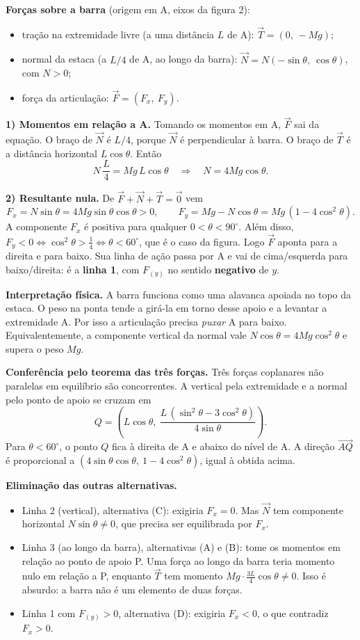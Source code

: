 \documentclass{article}%
\begin{document}
\textbf{Forças sobre a barra} (origem em A, eixos da figura 2):
\begin{itemize}
\item tração na extremidade livre (a uma distância $L$ de A): $\vec T = (0,\,-Mg)$;
\item normal da estaca (a $L/4$ de A, ao longo da barra): $\vec N = N(-\sin\theta,\ \cos\theta)$, com $N>0$;
\item força da articulação: $\vec F = (F_x,\ F_y)$.
\end{itemize}

\textbf{1) Momentos em relação a A.} Tomando os momentos em A, $\vec F$ sai da equação. O braço de $\vec N$ é $L/4$, porque $\vec N$ é perpendicular à barra. O braço de $\vec T$ é a distância horizontal $L\cos\theta$. Então
\[
N\,\frac{L}{4} = Mg\,L\cos\theta \quad\Longrightarrow\quad N = 4Mg\cos\theta .
\]

\textbf{2) Resultante nula.} De $\vec F + \vec N + \vec T = \vec 0$ vem
\[
F_x = N\sin\theta = 4Mg\sin\theta\cos\theta > 0, \qquad
F_y = Mg - N\cos\theta = Mg\,(1-4\cos^2\theta).
\]
A componente $F_x$ é positiva para qualquer $0<\theta<90^\circ$. Além disso, $F_y<0 \iff \cos^2\theta>\tfrac14 \iff \theta<60^\circ$, que é o caso da figura. Logo $\vec F$ aponta para a direita e para baixo. Sua linha de ação passa por A e vai de cima/esquerda para baixo/direita: é a \textbf{linha 1}, com $F_{(y)}$ no sentido \textbf{negativo} de $y$.

\textbf{Interpretação física.} A barra funciona como uma alavanca apoiada no topo da estaca. O peso na ponta tende a girá-la em torno desse apoio e a levantar a extremidade A. Por isso a articulação precisa \emph{puxar} A para baixo. Equivalentemente, a componente vertical da normal vale $N\cos\theta = 4Mg\cos^2\theta$ e supera o peso $Mg$.

\textbf{Conferência pelo teorema das três forças.} Três forças coplanares não paralelas em equilíbrio são concorrentes. A vertical pela extremidade e a normal pelo ponto de apoio se cruzam em
\[
Q=\left(L\cos\theta,\ \frac{L\,(\sin^2\theta-3\cos^2\theta)}{4\sin\theta}\right).
\]
Para $\theta<60^\circ$, o ponto $Q$ fica à direita de A e abaixo do nível de A. A direção $\overrightarrow{AQ}$ é proporcional a $(4\sin\theta\cos\theta,\ 1-4\cos^2\theta)$, igual à obtida acima.

\textbf{Eliminação das outras alternativas.}
\begin{itemize}
\item Linha 2 (vertical), alternativa (C): exigiria $F_x=0$. Mas $\vec N$ tem componente horizontal $N\sin\theta\neq 0$, que precisa ser equilibrada por $F_x$.
\item Linha 3 (ao longo da barra), alternativas (A) e (B): tome os momentos em relação ao ponto de apoio P. Uma força ao longo da barra teria momento nulo em relação a P, enquanto $\vec T$ tem momento $Mg\cdot\tfrac{3L}{4}\cos\theta\neq 0$. Isso é absurdo: a barra não é um elemento de duas forças.
\item Linha 1 com $F_{(y)}>0$, alternativa (D): exigiria $F_x<0$, o que contradiz $F_x>0$.
\end{itemize}
\end{document}
